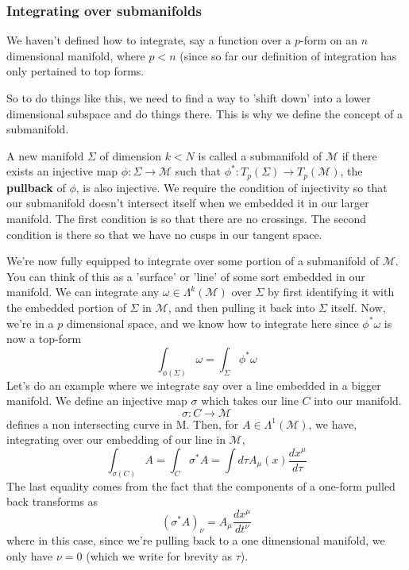 \documentclass[11pt, a4paper]{article}   	%
\theoremstyle{slplain}
\begin{document}
\subsubsection{Integrating over submanifolds} 

We haven't defined how to integrate, say a function 
over a $ p $-form on an 
$ n $ dimensional manifold, where $ p < n $ 
(since so far our definition of integration 
has only pertained to top forms. 

So to do things like this, we need to 
find a way to 'shift down' into a lower dimensional 
subspace and do things there. This is why we define the concept of a submanifold.

A new manifold $ \Sigma $ of dimension $ k < N $ is called a submanifold
of $ \mathcal{ M  }$ if there exists an injective map $ \phi : \Sigma \to \mathcal{ M }$ 
such that $ \phi^ * : T_p ( \Sigma ) \to T_p ( \mathcal{ M } ) $, the 
\textbf{pullback} of $ \phi $, is also 
injective. We require the condition of injectivity 
so that our submanifold doesn't intersect itself 
when we embedded it in our larger manifold.
The first condition is so that there are no crossings. 
The second condition is there so that we have no cusps in our tangent space.

We're now fully equipped to integrate over 
some portion of a submanifold of $ \mathcal{ M } $. 
You can think of this as a 'surface' or 'line' of 
some sort embedded in our manifold. 
We can integrate any $ \omega  \in \Lambda^ k ( \mathcal{ M } ) $ over  $\Sigma $ 
by first identifying it with the embedded portion of $ \Sigma $
in  $ \mathcal{ M } $, and then pulling it back into $\Sigma $
itself. Now, we're in a  $ p $ dimensional space, 
and we know how to integrate here since $ \phi ^ * \omega $ is 
now a top-form
\[
\int_{ \phi ( \Sigma ) } \omega = \int_{ \Sigma } \phi^ * \omega
\]  
Let's do an example where we integrate say over a line 
embedded in a bigger manifold. 
We define an injective map $ \sigma $ which 
takes our line $ C $ into our manifold. 
\[
\sigma : C\to \mathcal{ M }
\] defines a non intersecting curve in M. Then, for 
$ A \in \Lambda ^ 1 ( \mathcal{ M } ) $, we have, 
integrating over our embedding of our line in $\mathcal{ M } $, 
\[
\int_{ \sigma ( C) } A = \int_{ C } \sigma^ * A = \int d \tau A_{ \mu } ( x) \frac{ dx^ \mu }{d \tau }
\] 
The last equality comes from the fact that the 
components of a one-form pulled back transforms as
\[
 ( \sigma ^ * A )_\nu = A_\mu  \frac{ d x ^ \mu  }{ dt ^ \nu }
\] where in this case, since 
we're pulling back to a one dimensional 
manifold, we only have $ \nu = 0 $  (which we write
for brevity as $ \tau $). 
\end{document}
